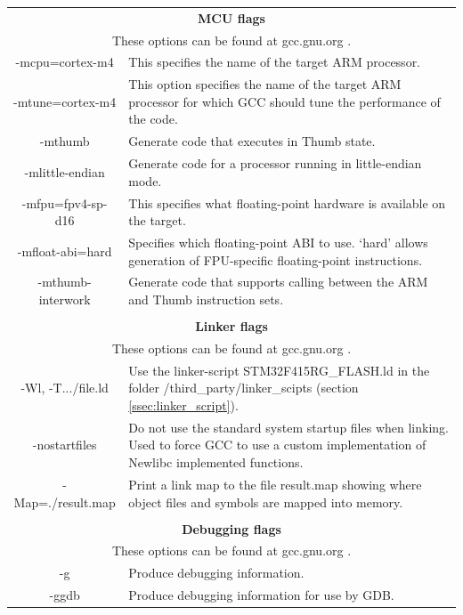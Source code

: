 \begin{table}[H]
	\centering
	\begin{tabular}{|c|p{10cm}|}
		\multicolumn{2}{c}{\textbf{MCU flags}} \\
		\multicolumn{2}{c}{These options can be found at gcc.gnu.org \cite{gcc_arm_options}.} \\
		\hline
		-mcpu=cortex-m4   &
		This specifies the name of the target ARM processor. \\
		\hline
		-mtune=cortex-m4  &
		This option specifies the name of the target ARM processor for which GCC should tune the performance of the code. \\
		\hline
		-mthumb           &
		Generate code that executes in Thumb state. \\
		\hline
		-mlittle-endian   &
		Generate code for a processor running in little-endian mode. \\
		\hline
		-mfpu=fpv4-sp-d16 &
		This specifies what floating-point hardware is available on the target. \\
		\hline
		-mfloat-abi=hard  &
		Specifies which floating-point ABI to use.
		`hard' allows generation of FPU-specific floating-point instructions. \\
		\hline
		-mthumb-interwork &
		Generate code that supports calling between the ARM and Thumb instruction sets. \\
		
		\hline
		\multicolumn{2}{c}{} \\
		\multicolumn{2}{c}{\textbf{Linker flags}} \\
		\multicolumn{2}{c}{These options can be found at gcc.gnu.org \cite{gcc_linking_options}.} \\
		\hline
		-Wl, -T.../file.ld &
		Use the linker-script STM32F415RG\_FLASH.ld in the folder
		/third\_party/linker\_scipts (section \ref{ssec:linker_script}). \\
		\hline
		-nostartfiles   &
		Do not use the standard system startup files when linking.
		Used to force GCC to use a custom implementation of Newlibc implemented functions. \\
		\hline
		-Map=./result.map &
		Print a link map to the file result.map showing where object files and symbols are mapped into memory. \\
		
		\hline
		\multicolumn{2}{c}{} \\
		\multicolumn{2}{c}{\textbf{Debugging flags}} \\
		\multicolumn{2}{c}{These options can be found at gcc.gnu.org \cite{gcc_debug_options}.} \\
		\hline
		-g &
		Produce debugging information. \\
		\hline
		-ggdb &
		Produce debugging information for use by GDB. \\
		

\end{tabular}
\end{table}
